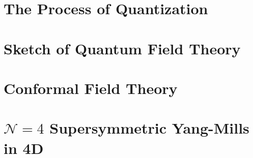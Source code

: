 	
	\section{The Process of Quantization} %
	\label{sec:the_process_of_quantization}
	
	
	\section{Sketch of Quantum Field Theory} %
	\label{sec:sketch_of_quantum_field_theory}
	

	\section{Conformal Field Theory} %
	\label{sec:conformal_field_theory}
	
	
	\section{$\mathcal N = 4$ Supersymmetric Yang-Mills in 4D} %
	\label{sec:n4susy}
	
